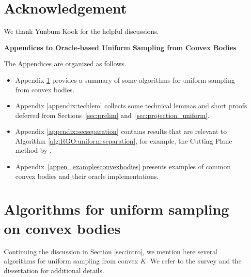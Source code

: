 \documentclass[11pt,letterpaper]{article}
\begin{document}





\section*{Acknowledgement}
We thank Yunbum Kook for the helpful discussions.







\newpage
\appendix
\begin{center}
\Large \bf Appendices to Oracle-based Uniform Sampling from Convex Bodies
\end{center}

The Appendices are organized as follows.

\begin{itemize}
\item Appendix \ref{appendix:uniformsampling} provides a summary of some algorithms for uniform sampling from convex bodies.

\item Appendix \ref{appendix:techlem} collects some technical lemmas and short proofs deferred from Sections~\ref{sec:prelim} and~\ref{sec:projection_uniform}. 
 
\item Appendix \ref{appendix:secseparation} contains results that are relevant to Algorithm \ref{alg:RGO:uniform:separation}, for example, the Cutting Plane method by \cite{jiang2020cuttingplane}.

\item Appendix~\ref{appen_examplesconvexbodies} presents examples of common convex bodies and their oracle implementations. 
\end{itemize}

\section{Algorithms for uniform sampling on convex bodies}
\label{appendix:uniformsampling}

Continuing the discussion in Section \ref{sec:intro}, we mention here several algorithms for uniform sampling from convex $K$. We refer to the survey \cite{vempala2005survey,vempala2010recent} and the dissertation \cite{cousins2017efficient} for additional details. 
\end{document}
